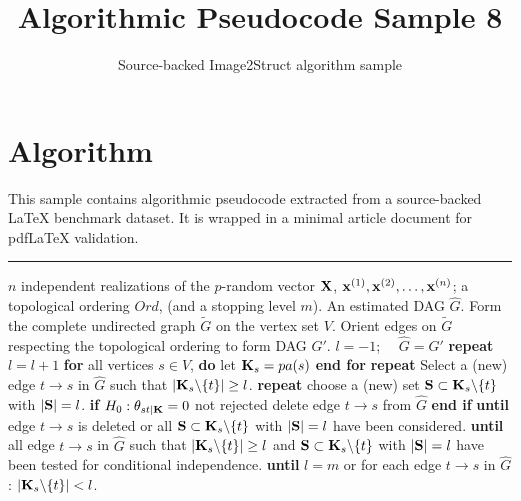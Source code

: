 \documentclass[11pt]{article}
\title{Algorithmic Pseudocode Sample 8}
\author{Source-backed Image2Struct algorithm sample}
\date{}
\begin{document}
\maketitle
\section{Algorithm}
This sample contains algorithmic pseudocode extracted from a source-backed LaTeX benchmark dataset. It is wrapped in a minimal article document for pdfLaTeX validation.

\begin{algorithm}[htbp]
\caption{Source-backed algorithmic procedure}
\begin{algorithmic}[1]
\hrule
\vskip 2pt
 $n$ independent realizations of the $p$-random vector $\bold{X}$, $\bold{x}^{(1)},\bold{x}^{(2)},\ldots,\bold{x}^{(n)}$; a topological ordering $Ord$, (and a stopping level $m$).
 An estimated DAG $\hat{G}$.
\State{} Form the complete undirected graph $\tilde{G}$ on the vertex set $V$.
\State{} Orient edges on $\tilde{G}$ respecting the topological ordering to form DAG $G'$.
\State{} $l=-1$; $\quad \hat{G}=G'$
\State{} \textbf{repeat}
\State{} \quad $l=l+1$
\State{} \quad \textbf{for} all vertices $s\in V$, \textbf{do}
\State{} \quad\quad let $\bold{K}_s = pa(s)$
\State{} \quad \textbf{end for}
\State{} \quad \textbf{repeat}
\State{} \quad\quad
Select a (new) edge $t\rightarrow s$ in $\hat{G}$ such that
\State{} \quad\quad$|\bold{K}_s\backslash\{t\}|\ge l$.
\State{} \quad\quad\textbf{repeat}
\State{} \quad\quad\quad choose a (new) set $\bold{S}\subset \bold{K}_s\backslash\{t\}$ with $|\bold{S}|=l$.
\State{} \quad\quad\quad\textbf{if} $H_0: {\theta}_{st|\bold{K}}=0$ not rejected%
\State{} \quad\quad\quad\quad delete edge $t\rightarrow s$ from $\hat{G}$
\State{} \quad\quad\quad \textbf{end if}
\State{} \quad\quad\textbf{until} edge $t\rightarrow s$ is deleted or all $\bold{S}\subset \bold{K}_s\backslash\{t\}$ with $|\bold{S}|=l$ have been considered.
\State{} \quad\textbf{until} all edge $t\rightarrow s$ in $\hat{G}$ such that $|\bold{K}_s\backslash\{t\}|\ge l$ and
$\bold{S}\subset \bold{K}_s\backslash\{t\}$ with $|\bold{S}|=l$ have been tested for conditional independence.
\State{} \textbf{until} $l=m$ or for each edge $t\rightarrow s$ in $\hat{G}$: $|\bold{K}_s\backslash\{t\}|< l$.
\end{algorithmic}
\end{algorithm}
\end{document}
